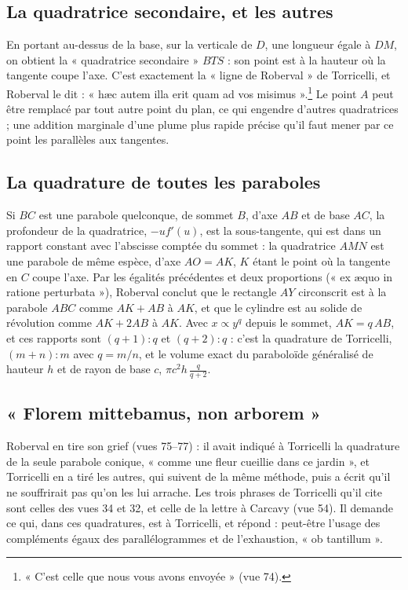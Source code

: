 \documentclass[11pt,a4paper]{article}
\begin{document}
\subsection*{La quadratrice secondaire, et les autres}

En portant au-dessus de la base, sur la verticale de $D$, une longueur égale à
$DM$, on obtient la « quadratrice secondaire » $BTS$ : son point est à la hauteur
où la tangente coupe l'axe. C'est exactement la « ligne de Roberval » de
Torricelli, et Roberval le dit : « hæc autem illa erit quam ad vos
misimus ».\footnote{« C'est celle que nous vous avons envoyée » (vue 74).} Le
point $A$ peut être remplacé par tout autre point du plan, ce qui engendre
d'autres quadratrices ; une addition marginale d'une plume plus rapide précise
qu'il faut mener par ce point les parallèles aux tangentes.

\subsection*{La quadrature de toutes les paraboles}

Si $BC$ est une parabole quelconque, de sommet $B$, d'axe $AB$ et de base $AC$,
la profondeur de la quadratrice, $-uf'(u)$, est la sous-tangente, qui est dans un
rapport constant avec l'abscisse comptée du sommet : la quadratrice $AMN$ est une
parabole de même espèce, d'axe $AO = AK$, $K$ étant le point où la tangente en $C$
coupe l'axe. Par les égalités précédentes et deux proportions (« ex æquo in
ratione perturbata »), Roberval conclut que le rectangle $AY$ circonscrit est à la
parabole $ABC$ comme $AK+AB$ à $AK$, et que le cylindre est au solide de
révolution comme $AK+2AB$ à $AK$. Avec $x\propto y^q$ depuis le sommet, $AK = q\,
AB$, et ces rapports sont $(q+1):q$ et $(q+2):q$ : c'est la quadrature de
Torricelli, $(m+n):m$ avec $q = m/n$, et le volume exact du paraboloïde
généralisé de hauteur $h$ et de rayon de base $c$, $\pi c^2h\,\frac{q}{q+2}$.

\subsection*{« Florem mittebamus, non arborem »}

Roberval en tire son grief (vues 75--77) : il avait indiqué à Torricelli la
quadrature de la seule parabole conique, « comme une fleur cueillie dans ce
jardin », et Torricelli en a tiré les autres, qui suivent de la même méthode, puis
a écrit qu'il ne souffrirait pas qu'on les lui arrache. Les trois phrases de
Torricelli qu'il cite sont celles des vues 34 et 32, et celle de la lettre à
Carcavy (vue 54). Il demande ce qui, dans ces quadratures, est à Torricelli, et
répond : peut-être l'usage des compléments égaux des parallélogrammes et de
l'exhaustion, « ob tantillum ».
\end{document}
